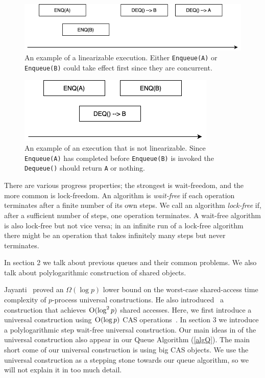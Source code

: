 \documentclass[10pt]{article}
\theoremstyle{definition}
\begin{document}
\begin{figure}[hbt]
  \center\includegraphics[scale=0.5]{pics/good}
  \caption{\label{fig::goodexample}An example of a linearizable execution. Either \texttt{Enqueue(A)} or \texttt{Enqueue(B)} could take effect first since they are concurrent.}
\end{figure}

\begin{figure}[hbt]
  \center\includegraphics[scale=0.5]{pics/bad}
  \caption{\label{fig::badexample}An example of an execution that is not linearizable. Since \texttt{Enqueue(A)} has completed before \texttt{Enqueue(B)} is invoked the \texttt{Dequeue()} should return \texttt{A} or nothing.}
\end{figure}


There are various progress properties; the strongest is wait-freedom, and the more common is lock-freedom. An algorithm is \textit{wait-free} if each operation terminates after a finite number of its own steps. We call an algorithm \textit{lock-free} if, after a sufficient number of steps, one operation terminates. A wait-free algorithm is also lock-free but not vice versa; in an infinite run of a lock-free algorithm there might be an operation that takes infinitely many steps but never terminates.

In section 2 we talk about previous queues and their common problems. We also talk about polylogarithmic construction of shared objects.

Jayanti~\cite{DBLP:conf/podc/Jayanti98a} proved an $\Omega(\log p)$ lower bound on the worst-case shared-access time complexity of $p$-process universal constructions. He also introduced~\cite{DBLP:conf/podc/ChandraJT98} a construction that achieves $\textsc{O}(\log^2 p)$ shared accesses. Here, we first introduce a universal construction using $\textsc{O}(\log p)$ CAS operations~\cite{DBLP:conf/fsttcs/JayantiP05}. In section 3 we introduce a polylogarithmic step wait-free universal construction. Our main ideas in of the universal construction also appear in our Queue Algorithm (\ref{algQ}). The main short come of our universal construction is using big CAS objects. We use the universal construction as a stepping stone towards our queue algorithm, so we will not explain it in too much detail.
\end{document}
